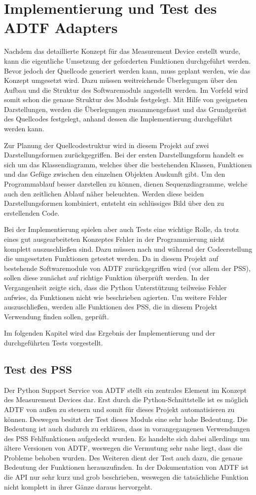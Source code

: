 \documentclass[12pt,a4paper]{report}
\begin{document}
\chapter{Implementierung und Test des ADTF Adapters}\label{chap:Implementierung}
Nachdem das detaillierte Konzept für das Measurement Device erstellt wurde, kann die eigentliche Umsetzung der geforderten  Funktionen durchgeführt werden. Bevor jedoch der Quellcode generiert werden kann, muss geplant werden, wie das Konzept umgesetzt wird. Dazu müssen weitreichende Überlegungen über den Aufbau und die Struktur des Softwaremoduls angestellt werden. Im Vorfeld wird somit schon die genaue Struktur des Moduls festgelegt. Mit Hilfe von geeigneten Darstellungen, werden die Überlegungen zusammengefasst und das Grundgerüst des Quellcodes festgelegt, anhand dessen die Implementierung durchgeführt werden kann.

Zur Planung der Quellcodestruktur wird in diesem Projekt auf zwei Darstellungsformen zurückgegriffen. Bei der ersten Darstellungsform handelt es sich um das Klassendiagramm, welches über die bestehenden Klassen, Funktionen und das Gefüge zwischen den einzelnen Objekten Auskunft gibt. Um den Programmablauf besser darstellen zu können, dienen Sequenzdiagramme, welche auch den zeitlichen Ablauf näher beleuchten. Werden diese beiden Darstellungsformen kombiniert, entsteht ein schlüssiges Bild über den zu erstellenden Code.

Bei der Implementierung spielen aber auch Tests eine wichtige Rolle, da trotz eines gut ausgearbeiteten Konzeptes Fehler in der Programmierung nicht komplett auszuschließen sind. Dazu müssen nach und während der Codeerstellung die umgesetzten Funktionen getestet werden. Da in diesem Projekt auf bestehende Softwaremodule von ADTF zurückgegriffen wird (vor allem der PSS), sollen diese zunächst auf richtige Funktion überprüft werden. In der Vergangenheit zeigte sich, dass die Python Unterstützung teilweise Fehler aufwies, da Funktionen nicht wie beschrieben agierten. Um weitere Fehler auszuschließen, werden alle Funktionen des PSS, die in diesem Projekt Verwendung finden sollen, geprüft.

Im folgenden Kapitel wird das Ergebnis der Implementierung und der durchgeführten Tests vorgestellt.
\section{Test des PSS}\label{sec:Test des PSS}
Der Python Support Service von ADTF stellt ein zentrales Element im Konzept des Measurement Devices dar. Erst durch die Python-Schnittstelle ist es möglich ADTF von außen zu steuern und somit für dieses Projekt automatisieren zu können. Deswegen besitzt der Test dieses Moduls eine sehr hohe Bedeutung. Die Bedeutung ist auch dadurch zu erklären, dass in vorangegangenen Verwendungen des PSS Fehlfunktionen aufgedeckt wurden. Es handelte sich dabei allerdings um ältere Versionen von ADTF, weswegen die Vermutung sehr nahe liegt, dass die Probleme behoben wurden. Des Weiteren dient der Test auch dazu, die genaue Bedeutung der Funktionen herauszufinden. In der Dokumentation von ADTF \cite{ADTFDokuSDK}  ist die API nur sehr kurz und grob beschrieben, weswegen die tatsächliche Funktion nicht komplett in ihrer Gänze daraus hervorgeht. 
\end{document}
